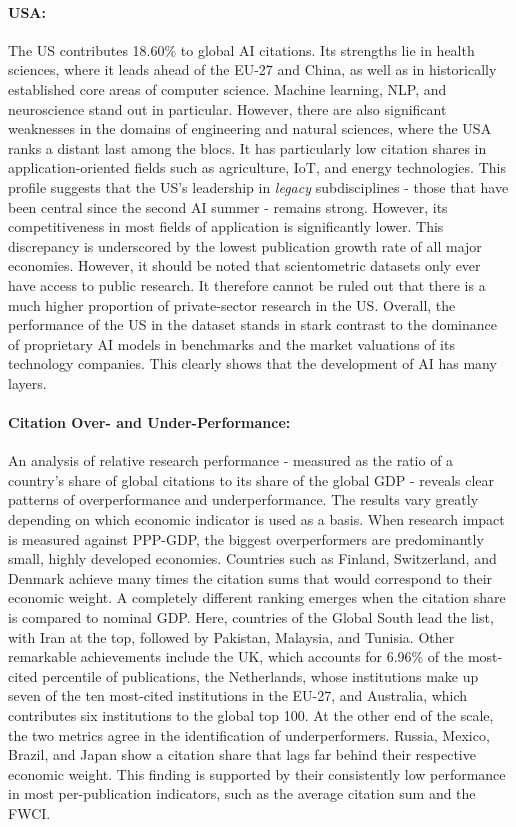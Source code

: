 \documentclass{article}
\begin{document}
	\paragraph{USA:}The US contributes 18.60\% to global AI citations. Its strengths lie in health sciences, where it leads ahead of the EU-27 and China, as well as in historically established core areas of computer science. Machine learning, NLP, and neuroscience stand out in particular. However, there are also significant weaknesses in the domains of engineering and natural sciences, where the USA ranks a distant last among the blocs. It has particularly low citation shares in application-oriented fields such as agriculture, IoT, and energy technologies. This profile suggests that the US's leadership in \textit{legacy} subdisciplines - those that have been central since the second AI summer - remains strong. However, its competitiveness in most fields of application is significantly lower. This discrepancy is underscored by the lowest publication growth rate of all major economies. However, it should be noted that scientometric datasets only ever have access to public research. It therefore cannot be ruled out that there is a much higher proportion of private-sector research in the US. Overall, the performance of the US in the dataset stands in stark contrast to the dominance of proprietary AI models in benchmarks and the market valuations of its technology companies. This clearly shows that the development of AI has many layers.
	
	\paragraph{Citation Over- and Under-Performance:} An analysis of relative research performance - measured as the ratio of a country's share of global citations to its share of the global GDP - reveals clear patterns of overperformance and underperformance. The results vary greatly depending on which economic indicator is used as a basis. When research impact is measured against PPP-GDP, the biggest overperformers are predominantly small, highly developed economies. Countries such as Finland, Switzerland, and Denmark achieve many times the citation sums that would correspond to their economic weight. A completely different ranking emerges when the citation share is compared to nominal GDP. Here, countries of the Global South lead the list, with Iran at the top, followed by Pakistan, Malaysia, and Tunisia. Other remarkable achievements include the UK, which accounts for 6.96\% of the most-cited percentile of publications, the Netherlands, whose institutions make up seven of the ten most-cited institutions in the EU-27, and Australia, which contributes six institutions to the global top 100. At the other end of the scale, the two metrics agree in the identification of underperformers. Russia, Mexico, Brazil, and Japan show a citation share that lags far behind their respective economic weight. This finding is supported by their consistently low performance in most per-publication indicators, such as the average citation sum and the FWCI. 
	
\end{document}
